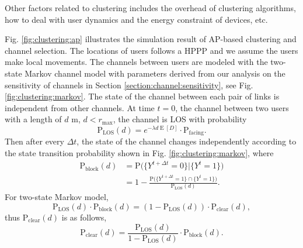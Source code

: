 \documentclass[10pt, conference, letterpaper]{IEEEtran}
\DeclareMathOperator*{\E}{\mathrm{E}}
\DeclareMathOperator*{\LOS}{\mathrm{LOS}}
\begin{document}
Other factors related to clustering includes the overhead of clustering algorithms, how to deal with user dynamics and the energy constraint of devices, etc.




Fig. \ref{fig:clustering:ap} illustrates the simulation result of AP-based clustering and channel selection. The locations of users follows a HPPP and we assume the users make local movements. The channels between users are modeled with the two-state Markov channel model \cite{timevaryingpathshadowing} with parameters derived from our analysis on the sensitivity of channels in Section \ref{section:channel:sensitivity}, see Fig. \ref{fig:clustering:markov}. The state of the channel between each pair of links is independent from other channels. At time $t = 0$, the channel between two users with a length of $d$ m, $d<r_{\max}$, the channel is LOS with probability 
\begin{equation*}
\mathrm{P}_{\mathrm{LOS}}(d) = e^{-\lambda d \E[D]}\cdot \mathrm{P}_{\mathrm{facing}}.
\end{equation*}
Then after every $\Delta t$, the state of the channel changes independently according to the state transition probability shown in Fig. \ref{fig:clustering:markov}, where
\begin{equation*}
\begin{aligned}
\mathrm{P}_{\mathrm{block}}(d) & = \mathrm{P}\big(\{Y^{t+\Delta t} = 0\}|\{Y^{t} = 1\}\big) \\
				   & = 1 - \frac{\mathrm{P}\big(\{Y^{t+\Delta t} = 1\}\cap\{Y^{t} = 1\}\big)}{\mathrm{P}_{\LOS}(d)}.
\end{aligned}
\end{equation*}
For two-state Markov model, 
\begin{equation*}
\mathrm{P}_{\LOS}(d)\cdot \mathrm{P}_{\mathrm{block}}(d) = (1 - \mathrm{P}_{\LOS}(d)) \cdot \mathrm{P_{clear}}(d),
\end{equation*}
thus $\mathrm{P_{clear}}(d)$ is as follows,
\begin{equation*}
\mathrm{P_{clear}}(d) = \frac{\mathrm{P_{LOS}}(d)}{1 - \mathrm{P_{LOS}}(d)}\cdot\mathrm{P_{block}}(d).
\end{equation*}
\end{document}
